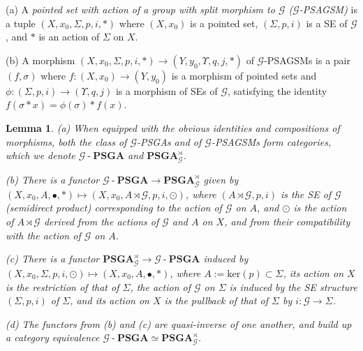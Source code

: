 \documentclass[10pt]{amsart}
\newtheorem{lem}[thm]{Lemma}
\numberwithin{equation}{subsection}
\begin{document}
\begin{defn}
    (a) A {\it pointed set with action of a group with split morphism to $\mathcal G$ ($\mathcal G$-PSAGSM)} is a tuple
$(X,x_0,\Sigma,p,i,*)$ where $(X,x_0)$ is a pointed set, $(\Sigma,p,i)$ is a SE of $\mathcal G$, and $*$ is an action of 
$\Sigma$ on $X$. 

(b) A morphism $(X,x_0,\Sigma,p,i,*)\to(Y,y_0,\Upsilon,q,j,*)$ of $\mathcal G$-PSAGSMs is a pair $(f,\sigma)$ where $f : (X,x_0)\to (Y,y_0)$
is a morphism of pointed sets and $\phi : (\Sigma,p,i)\to(\Upsilon,q,j)$ is a morphism of SEs of $\mathcal G$, satisfying the identity
$f(\sigma*x)=\phi(\sigma)*f(x)$. 
\end{defn}

\begin{lem}
(a) When equipped with the obvious identities and compositions of morphisms, both the class of $\mathcal G$-PSGAs and of 
$\mathcal G$-PSAGSMs form categories, which we denote $\mathcal G\operatorname{-}\mathbf{PSGA}$ and $\mathbf{PSGA}_{\mathcal G}^\rtimes$. 

(b) There is a functor 
 $\mathcal G\operatorname{-}\mathbf{PSGA}\to\mathbf{PSGA}_{\mathcal G}^\rtimes$ 
given by $(X,x_0,A,\bullet,*)\mapsto (X,x_0,A\rtimes\mathcal G,p,i,\odot)$, where 
$(A\rtimes\mathcal G,p,i)$ is the SE of $\mathcal G$ (semidirect product) corresponding to the action of 
$\mathcal G$ on $A$, and $\odot$ is the action of $A\rtimes\mathcal G$ derived from the actions of 
$\mathcal G$ and $A$ on $X$, and from their compatibility with the action of $\mathcal G$ on $A$. 

(c) There is a functor
 $\mathbf{PSGA}_{\mathcal G}^\rtimes\to\mathcal G\operatorname{-}\mathbf{PSGA}$ induced by 
$(X,x_0,\Sigma,p,i,\odot)\mapsto(X,x_0,A,\bullet,*)$, where $A:=\mathrm{ker}(p)\subset\Sigma$, its action on $X$ is the restriction of that of $\Sigma$, 
the action of $\mathcal G$ on $\Sigma$ is induced by the SE structure $(\Sigma,p,i)$ of $\Sigma$, and its action on $X$ is the pullback of that of $\Sigma$ by 
$i : \mathcal G\to\Sigma$.  

(d) The functors from (b) and (c) are quasi-inverse of one another, and build up a category equivalence 
 $\mathcal G\operatorname{-}\mathbf{PSGA}\simeq\mathbf{PSGA}_{\mathcal G}^\rtimes$.
 \end{lem}
\end{document}
